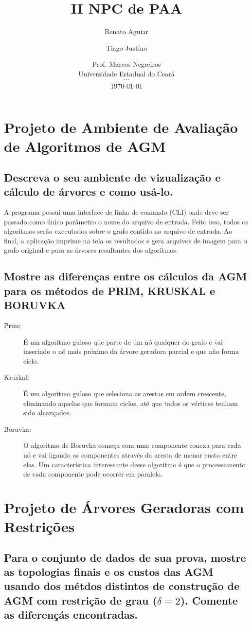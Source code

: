 \documentclass[12pt,a4paper]{article}
\title{II NPC de PAA}
\author{ Renato Aguiar \and Tiago Justino }
\date{
    Prof. Marcos Negreiros \\
	Universidade Estadual do Ceará \\
	$\cdots$ \\
	\today
}
\begin{document}
\maketitle

\section{Projeto de Ambiente de Avaliação de Algoritmos de AGM}
\subsection{Descreva o seu ambiente de vizualização e cálculo de árvores e como
usá-lo.}

A programa possui uma interface de linha de comando (CLI) onde deve ser passado
como único parâmetro o nome do arquivo de entrada. Feito isso, todos os
algoritmos serão executados sobre o grafo contido no arquivo de entrada. Ao
final, a aplicação imprime na tela os resultados e gera arquivos de imagem para
o grafo original e para as árvores resultantes dos algoritmos.

\subsection{Mostre as diferenças entre os cálculos da AGM para os métodos de
PRIM, KRUSKAL e BORUVKA}

\begin{description}
\item[Prim:] É um algoritmo guloso que parte de um nó qualquer do grafo e vai
inserindo o nó mais próximo da árvore geradora parcial e que não forma ciclo.
\item[Kruskal:] É um algoritmo guloso que seleciona as arestas em ordem crescente,
eliminando aquelas que formam ciclos, até que todos os vértices tenham sido
alcançados.
\item[Boruvka:] O algoritmo de Boruvka começa com uma componente conexa para
cada nó e vai ligando as componentes através da aresta de menor custo entre
elas. Um característica interessante desse algoritmo é que o processamento de
cada componente pode ocorrer em paralelo.
\end{description}

\section{Projeto de Árvores Geradoras com Restrições}

\subsection{Para o conjunto de dados de sua prova, mostre as topologias finais e
\label{2a}
os custos das AGM usando dos métdos distintos de construção de AGM com restrição
de grau ($\delta=2$). Comente as diferençás encontradas.}
\end{document}
